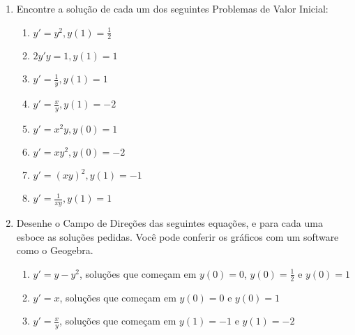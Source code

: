\documentclass[a4paper]{article}
\begin{document}
\begin{enumerate}


\item Encontre a solução de cada um dos seguintes Problemas de Valor
  Inicial:

  \begin{enumerate}
  \item $y' = y^2, y(1)=\frac{1}{2}$
  \item $2y'y = 1, y(1)=1$
  \item $y' = \frac{1}{y}, y(1)=1$
  \item $y' = \frac{x}{y}, y(1)=-2$
  \item $y' = x^2y, y(0)=1$
  \item $y' = xy^2, y(0)=-2$
  \item $y' = (xy)^2, y(1)=-1$
  \item $y' = \frac{1}{xy}, y(1)=1$
  \end{enumerate}

\item Desenhe o Campo de Direções das seguintes equações, e para cada
  uma esboce as soluções pedidas. Você pode conferir os gráficos com
  um software como o Geogebra.

  \begin{enumerate}
  \item $y' = y-y^2$, soluções que começam em $y(0)=0$,
    $y(0)=\frac{1}{2}$ e $y(0)=1$
  \item $y' = x$, soluções que começam em $y(0)=0$ e $y(0)=1$
  \item $y' = \frac{x}{y}$, soluções que começam em $y(1)=-1$ e $y(1)=-2$
  \end{enumerate}
\end{enumerate}
\end{document}
